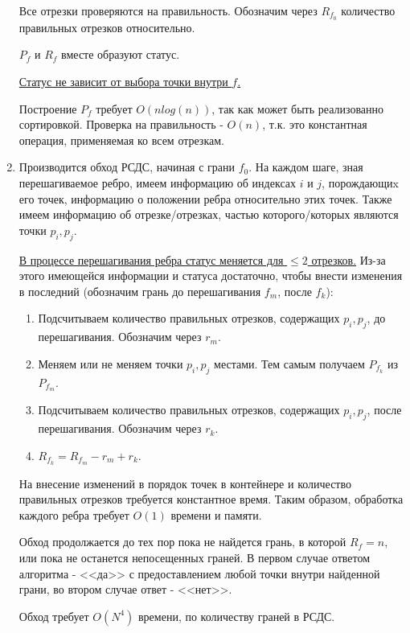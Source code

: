 \documentclass[letterpaper,12pt]{article}
\begin{document}
\begin{enumerate}
            Все отрезки проверяются на правильность. Обозначим через $R_{f_0}$
            количество правильных отрезков относительно.

            $P_f$ и $R_f$ вместе образуют статус.

            \hyperlink{proof}{Статус не зависит от выбора точки внутри $f$.}

            Построение $P_f$ требует $O(nlog(n))$, так как может быть
            реализованно сортировкой. Проверка на правильность - $O(n)$,
            т.к. это константная операция, применяемая ко всем отрезкам.
      \item Производится обход РСДС, начиная с грани $f_0$. 
            На каждом шаге, зная перешагиваемое ребро, 
            имеем информацию об индексах $i$ и $j$, порождающиx его точек,
            информацию о положении ребра относительно этих точек. 
            Также имеем информацию об отрезке/отрезках, частью 
            которого/которых являются точки $p_i, p_j$.

            \hyperlink{proof}{В процессе перешагивания ребра статус меняется для $\leq 2$
            отрезков.} Из-за этого имеющейся информации и статуса достаточно,
            чтобы внести изменения в последний
            (обозначим грань до перешагивания $f_m$, после $f_k$): 
            \begin{enumerate}
                  \item Подсчитываем количество правильных отрезков,
                        содержащих $p_i, p_j$, до перешагивания.
                        Обозначим через $r_m$.
                  \item Меняем или не меняем точки $p_i, p_j$ местами. 
                        Тем самым получаем $P_{f_k}$ из $P_{f_m}$.
                  \item Подсчитываем количество правильных отрезков,
                        содержащих $p_i, p_j$, после перешагивания.
                        Обозначим через $r_k$.
                  \item $R_{f_k} = R_{f_m} - r_m + r_k$.
            \end{enumerate}

            На внесение изменений в порядок точек в контейнере и 
            количество правильных отрезков требуется константное время.      
            Таким образом, обработка каждого ребра требует $O(1)$ времени 
            и памяти.

            Обход продолжается до тех пор пока не найдется грань, 
            в которой $R_f = n$, или пока не останется непосещенных граней.
            В первом случае ответом алгоритма - <<да>> с предоставлением 
            любой точки внутри найденной грани,  во втором случае 
            ответ - <<нет>>.

            Обход требует $O(N^4)$ времени, по количеству граней в РСДС.
\end{enumerate}
\end{document}
